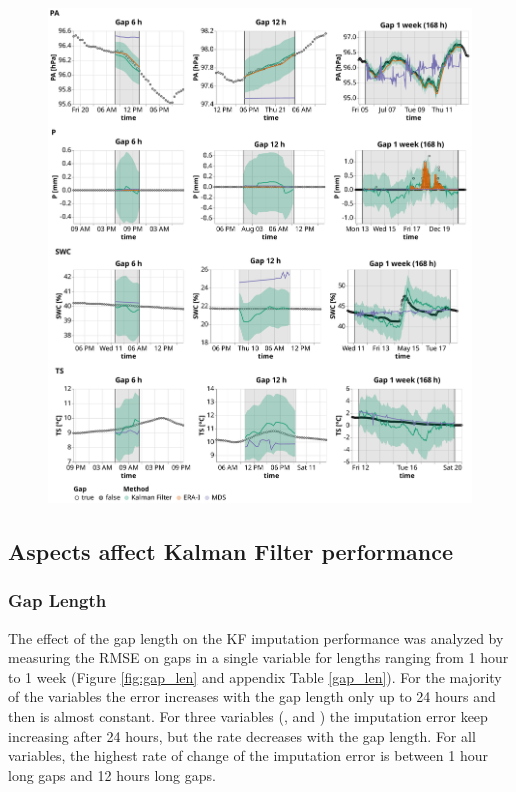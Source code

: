 \documentclass{article}
\newcommand{\imgwidth}{6in}
\let\Oldsubsection\subsection
\renewcommand{\subsection}{\FloatBarrier\Oldsubsection}
\begin{document}
\begin{figure}
\centerline{\includegraphics[width=\imgwidth]{timeseries_2}}
\caption{}
\label{fig:ts_1-2}
\end{figure}
\restoregeometry


\subsection{Aspects affect Kalman Filter performance}

\subsubsection{Gap Length}

The effect of the gap length on the KF imputation performance was analyzed by measuring the RMSE on gaps in a single variable for lengths ranging from 1 hour to 1 week (Figure \ref{fig:gap_len} and appendix Table \ref{gap_len}). For the majority of the variables the error increases with the gap length only up to 24 hours and then is almost constant. For three variables (,  and ) the imputation error keep increasing after 24 hours, but the rate decreases with the gap length. For all variables, the highest rate of change of the imputation error is between 1 hour long gaps and 12 hours long gaps.
\end{document}
